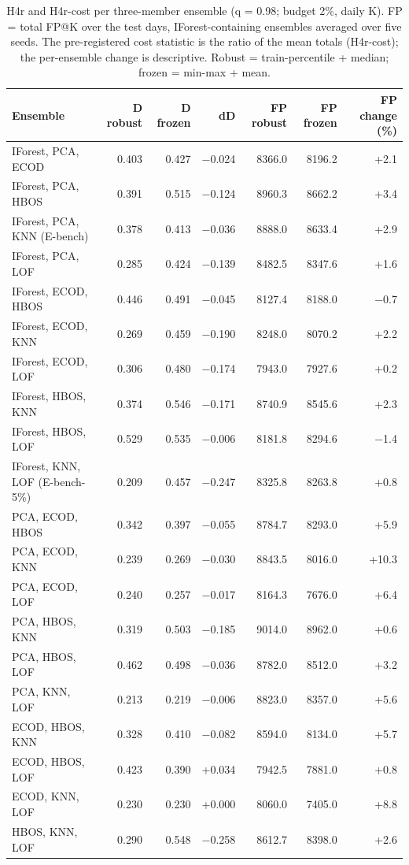 \begin{table}[t]
\centering
\footnotesize
\setlength{\tabcolsep}{3pt}
\caption{H4r and H4r-cost per three-member ensemble (q = 0.98; budget 2\%, daily K). FP = total FP@K over the test days, IForest-containing ensembles averaged over five seeds. The pre-registered cost statistic is the ratio of the mean totals (H4r-cost); the per-ensemble change is descriptive. Robust = train-percentile + median; frozen = min-max + mean.}
\label{tab:h4r-triples}
\begin{tabular}{lrrrrrr}
\toprule
Ensemble & D robust & D frozen & dD & FP robust & FP frozen & FP change (\%) \\
\midrule
IForest, PCA, ECOD & 0.403 & 0.427 & −0.024 & 8366.0 & 8196.2 & +2.1 \\
IForest, PCA, HBOS & 0.391 & 0.515 & −0.124 & 8960.3 & 8662.2 & +3.4 \\
IForest, PCA, KNN (E-bench) & 0.378 & 0.413 & −0.036 & 8888.0 & 8633.4 & +2.9 \\
IForest, PCA, LOF & 0.285 & 0.424 & −0.139 & 8482.5 & 8347.6 & +1.6 \\
IForest, ECOD, HBOS & 0.446 & 0.491 & −0.045 & 8127.4 & 8188.0 & −0.7 \\
IForest, ECOD, KNN & 0.269 & 0.459 & −0.190 & 8248.0 & 8070.2 & +2.2 \\
IForest, ECOD, LOF & 0.306 & 0.480 & −0.174 & 7943.0 & 7927.6 & +0.2 \\
IForest, HBOS, KNN & 0.374 & 0.546 & −0.171 & 8740.9 & 8545.6 & +2.3 \\
IForest, HBOS, LOF & 0.529 & 0.535 & −0.006 & 8181.8 & 8294.6 & −1.4 \\
IForest, KNN, LOF (E-bench-5\%) & 0.209 & 0.457 & −0.247 & 8325.8 & 8263.8 & +0.8 \\
PCA, ECOD, HBOS & 0.342 & 0.397 & −0.055 & 8784.7 & 8293.0 & +5.9 \\
PCA, ECOD, KNN & 0.239 & 0.269 & −0.030 & 8843.5 & 8016.0 & +10.3 \\
PCA, ECOD, LOF & 0.240 & 0.257 & −0.017 & 8164.3 & 7676.0 & +6.4 \\
PCA, HBOS, KNN & 0.319 & 0.503 & −0.185 & 9014.0 & 8962.0 & +0.6 \\
PCA, HBOS, LOF & 0.462 & 0.498 & −0.036 & 8782.0 & 8512.0 & +3.2 \\
PCA, KNN, LOF & 0.213 & 0.219 & −0.006 & 8823.0 & 8357.0 & +5.6 \\
ECOD, HBOS, KNN & 0.328 & 0.410 & −0.082 & 8594.0 & 8134.0 & +5.7 \\
ECOD, HBOS, LOF & 0.423 & 0.390 & +0.034 & 7942.5 & 7881.0 & +0.8 \\
ECOD, KNN, LOF & 0.230 & 0.230 & +0.000 & 8060.0 & 7405.0 & +8.8 \\
HBOS, KNN, LOF & 0.290 & 0.548 & −0.258 & 8612.7 & 8398.0 & +2.6 \\
\bottomrule
\end{tabular}
\end{table}
